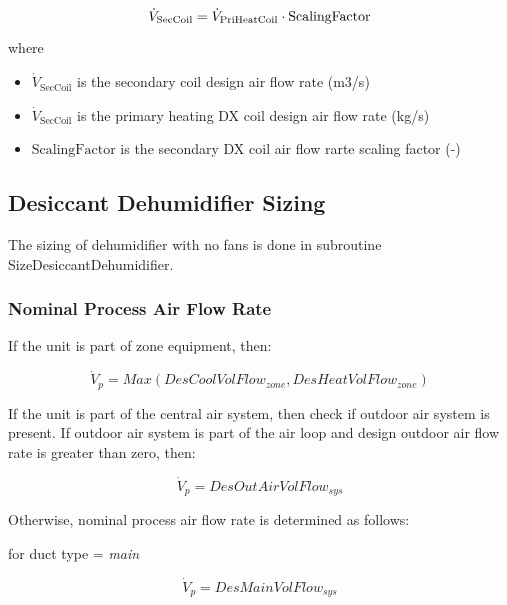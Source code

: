 \begin{equation}
  \dot{V}_{\rm{SecCoil}} = \dot{V}_{\rm{PriHeatCoil}} \cdot \text{ScalingFactor}
\end{equation}

where

\begin{itemize}
\tightlist
\item
  \(\dot{V}_\text{SecCoil}\) is the secondary coil design air flow rate (m3/s)
\item
  \(\dot{V}_\text{SecCoil}\) is the primary heating DX coil design air flow rate (kg/s)
\item
  \(\text{ScalingFactor}\) is the secondary DX coil air flow rarte scaling factor (-)
\end{itemize}

\subsection{Desiccant Dehumidifier Sizing}\label{desiccant-dehumidifier-sizing}

The sizing of dehumidifier with no fans is done in subroutine SizeDesiccantDehumidifier.

\subsubsection{Nominal Process Air Flow Rate}\label{nominal-process-air-flow-rate}

If the unit is part of zone equipment, then:

\begin{equation}
{\dot V_p} = Max\left( {DesCoolVolFlo{w_{zone}},DesHeatVolFlo{w_{zone}}} \right)
\end{equation}

If the unit is part of the central air system, then check if outdoor air system is present. If outdoor air system is part of the air loop and design outdoor air flow rate is greater than zero, then:

\begin{equation}
{\dot V_p} = DesOutAirVolFlo{w_{sys}}
\end{equation}

Otherwise, nominal process air flow rate is determined as follows:

for duct type = \emph{main}

\begin{equation}
{\dot V_p} = DesMainVolFlo{w_{sys}}
\end{equation}

